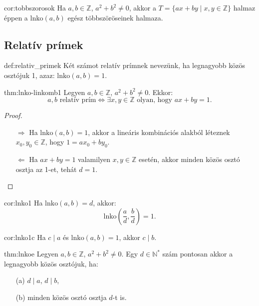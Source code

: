 \begin{corollary}{cor:tobbszorosok}
Ha $a,b\in\mathbb{Z}$, $a^{2}+b^{2}\neq0$, akkor a $T=\{ax+by\mid x,y\in\mathbb{Z}\}$ halmaz éppen a $\mathrm{lnko}(a,b)$ egész többszöröseinek halmaza.
\end{corollary}


\subsection*{Relatív prímek}
\begin{definition}{def:relativ_primek}
Két számot relatív prímnek nevezünk, ha legnagyobb közös osztójuk
1, azaz: $\mathrm{lnko}(a,b)=1.$
\end{definition}

\begin{theorem}{thm:lnko-linkomb1}
Legyen $a,b\in\mathbb{Z}$, $a^{2}+b^{2}\neq0$. Ekkor: 
\[
a,b\text{ relatív prím}\iff\exists x,y\in\mathbb{Z}\text{ olyan, hogy }ax+by=1.
\]
\end{theorem}

\begin{proof}
~
\begin{itemize}
\item[$\Rightarrow$] Ha $\mathrm{lnko}(a,b)=1$, akkor a lineáris kombinációs alakból
léteznek $x_{0},y_{0}\in\mathbb{Z}$, hogy $1=ax_{0}+by_{0}$.
\item[$\Leftarrow$] Ha $ax+by=1$ valamilyen $x,y\in\mathbb{Z}$ esetén, akkor minden
közös osztó osztja az 1-et, tehát $d=1$.
\end{itemize}
\end{proof}
\begin{corollary}{cor:lnko1}
Ha $\mathrm{lnko}(a,b)=d$, akkor: 
\[
\mathrm{lnko}\left(\frac{a}{d},\frac{b}{d}\right)=1.
\]
\end{corollary}

\begin{corollary}{cor:lnko1c}
Ha $c\mid a$ és $\mathrm{lnko}(a,b)=1$, akkor $c\mid b$.
\end{corollary}

\begin{theorem}{thm:lnkoe}
Legyen $a,b\in\mathbb{Z}$, $a^{2}+b^{2}\neq0$. Egy $d\in\mathbb{N}^{*}$
szám pontosan akkor a legnagyobb közös osztójuk, ha:
\begin{itemize}
\item[(a)] $d\mid a$, $d\mid b$,
\item[(b)] minden közös osztó osztja $d$-t is.
\end{itemize}
\end{theorem}

